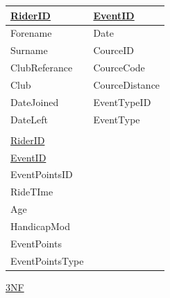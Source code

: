 \begin{tabular}{|l|l|}
\hline
\underline{RiderID} & \underline{EventID} \\ \hline
Forename            & Date                \\ \hline
Surname             & CourceID            \\ \hline
ClubReferance       & CourceCode          \\ \hline
Club                & CourceDistance      \\ \hline
DateJoined          & EventTypeID         \\ \hline
DateLeft            & EventType           \\ \hline
                    &                     \\ \hline
\underline{RiderID} &                     \\ \hline
\underline{EventID} &                     \\ \hline 
EventPointsID       &                     \\ \hline
RideTIme            &                     \\ \hline
Age                 &                     \\ \hline
HandicapMod         &                     \\ \hline
EventPoints         &                     \\ \hline
EventPointsType      &                     \\ \hline
\end{tabular}

\underline{3NF}


